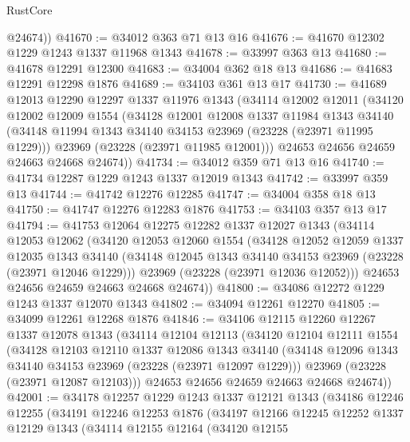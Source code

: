 \begin{lexlean}{RustCore}
\begin{coremodule}
        @24674))
@41670 := @34012 @363 @71 @13 @16
@41676 := @41670 @12302 @1229 @1243 @1337 @11968 @1343
@41678 := @33997 @363 @13
@41680 := @41678 @12291 @12300
@41683 := @34004 @362 @18 @13
@41686 := @41683 @12291 @12298 @1876
@41689 := @34103 @361 @13 @17
@41730 := @41689
    @12013
    @12290
    @12297
    @1337
    @11976
    @1343
    (@34114
      @12002
      @12011
      (@34120
        @12002
        @12009
        @1554
        (@34128
          @12001
          @12008
          @1337
          @11984
          @1343
          @34140
          (@34148 @11994 @1343 @34140 @34153 @23969 (@23228 (@23971 @11995 @1229)))
          @23969
          (@23228 (@23971 @11985 @12001)))
        @24653
        @24656
        @24659
        @24663
        @24668
        @24674))
@41734 := @34012 @359 @71 @13 @16
@41740 := @41734 @12287 @1229 @1243 @1337 @12019 @1343
@41742 := @33997 @359 @13
@41744 := @41742 @12276 @12285
@41747 := @34004 @358 @18 @13
@41750 := @41747 @12276 @12283 @1876
@41753 := @34103 @357 @13 @17
@41794 := @41753
    @12064
    @12275
    @12282
    @1337
    @12027
    @1343
    (@34114
      @12053
      @12062
      (@34120
        @12053
        @12060
        @1554
        (@34128
          @12052
          @12059
          @1337
          @12035
          @1343
          @34140
          (@34148 @12045 @1343 @34140 @34153 @23969 (@23228 (@23971 @12046 @1229)))
          @23969
          (@23228 (@23971 @12036 @12052)))
        @24653
        @24656
        @24659
        @24663
        @24668
        @24674))
@41800 := @34086 @12272 @1229 @1243 @1337 @12070 @1343
@41802 := @34094 @12261 @12270
@41805 := @34099 @12261 @12268 @1876
@41846 := @34106
    @12115
    @12260
    @12267
    @1337
    @12078
    @1343
    (@34114
      @12104
      @12113
      (@34120
        @12104
        @12111
        @1554
        (@34128
          @12103
          @12110
          @1337
          @12086
          @1343
          @34140
          (@34148 @12096 @1343 @34140 @34153 @23969 (@23228 (@23971 @12097 @1229)))
          @23969
          (@23228 (@23971 @12087 @12103)))
        @24653
        @24656
        @24659
        @24663
        @24668
        @24674))
@42001 := @34178
    @12257
    @1229
    @1243
    @1337
    @12121
    @1343
    (@34186
      @12246
      @12255
      (@34191
        @12246
        @12253
        @1876
        (@34197
          @12166
          @12245
          @12252
          @1337
          @12129
          @1343
          (@34114
            @12155
            @12164
            (@34120
              @12155

\end{coremodule}
\end{lexlean}
